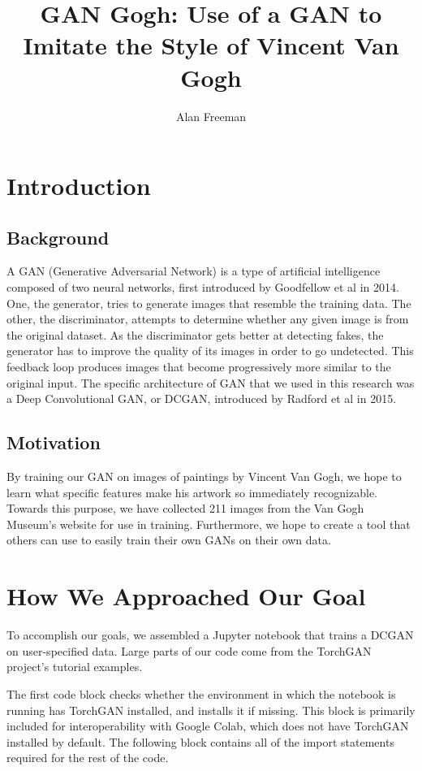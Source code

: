 \documentclass[12pt,letterpaper]{article}
\author{Alan Freeman}
\title{GAN Gogh: Use of a GAN to Imitate the Style of Vincent Van Gogh}
\begin{document}
	\maketitle
	\section{Introduction}
		\subsection{Background}
			A GAN (Generative Adversarial Network) is a type of artificial intelligence composed of two neural networks, first introduced by Goodfellow et al in 2014.\cite{NIPS2014_5ca3e9b1}
			One, the generator, tries to generate images that resemble the training data.
			The other, the discriminator, attempts to determine whether any given image is from the original dataset.
			As the discriminator gets better at detecting fakes, the generator has to improve the quality of its images in order to go undetected.
			This feedback loop produces images that become progressively more similar to the original input.
			The specific architecture of GAN that we used in this research was a Deep Convolutional GAN, or DCGAN, introduced by Radford et al in 2015.\cite{radford2015unsupervised}
		\subsection{Motivation}
			By training our GAN on images of paintings by Vincent Van Gogh, we hope to learn what specific features make his artwork so immediately recognizable.
			Towards this purpose, we have collected 211 images from the Van Gogh Museum's website for use in training.
			Furthermore, we hope to create a tool that others can use to easily train their own GANs on their own data.

	\section{How We Approached Our Goal}
		To accomplish our goals, we assembled a Jupyter notebook that trains a DCGAN on user-specified data.
		Large parts of our code come from the TorchGAN\cite{pal2019torchgan} project's tutorial examples.

		The first code block checks whether the environment in which the notebook is running has TorchGAN installed, and installs it if missing.
		This block is primarily included for interoperability with Google Colab, which does not have TorchGAN installed by default.
		The following block contains all of the import statements required for the rest of the code.
\end{document}
